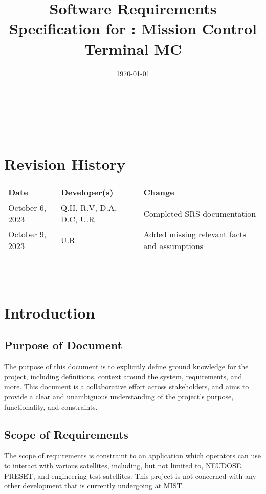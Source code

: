 \documentclass[12pt]{article}
\begin{document}
\title{Software Requirements Specification for \progname: Mission Control Terminal MC} 
\author{\authname}
\date{\today}
	
\maketitle

~\newpage


\tableofcontents

~\newpage

\section*{Revision History}
\begin{table}[hp]
\label{TblRevisionHistory}
\begin{tabularx}{\textwidth}{llX}
\toprule
\textbf{Date} & \textbf{Developer(s)} & \textbf{Change}\\
\midrule
October 6, 2023 & Q.H, R.V, D.A, D.C, U.R & Completed SRS documentation\\
October 9, 2023 & U.R & Added missing relevant facts and assumptions\\
\bottomrule
\end{tabularx}
\end{table}


~\\

~\newpage

\section{Introduction}
\subsection{Purpose of Document}
The purpose of this document is to explicitly define ground knowledge for the project, including definitions, context around the system, requirements, and more. This document is a collaborative effort across stakeholders, and aims to provide a clear and unambiguous understanding of the project’s purpose, functionality, and constraints.

\subsection{Scope of Requirements}
The scope of requirements is constraint to an application which operators can use to interact with various satellites, including, but not limited to, NEUDOSE, PRESET, and engineering test satellites. This project is not concerned with any other development that is currently undergoing at MIST.
\end{document}
